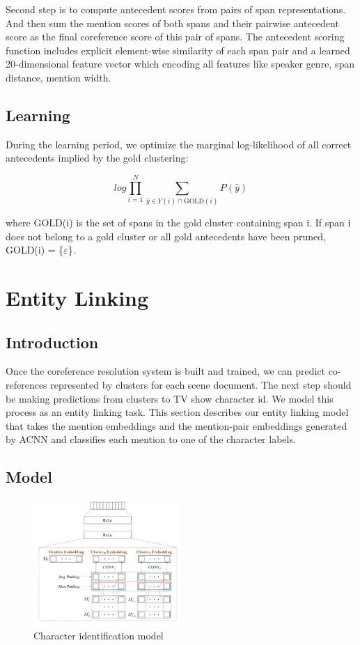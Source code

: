 \documentclass[11pt]{article}
\begin{document}
Second step is to compute antecedent scores from pairs of span representations. And then sum the mention scores of both spans and their pairwise antecedent score as the final coreference score of this pair of spans.
The antecedent scoring function includes explicit element-wise similarity of each span pair and a learned 20-dimensional feature vector which encoding all features like speaker genre, span distance, mention width.

\subsection{Learning}
During the learning period, we optimize the marginal log-likelihood of all correct antecedents implied by the gold clustering:

\begin{equation}
log\prod^{N}_{i=1}\sum_{\widehat{y}\in Y(i)\cap \text{GOLD}(i)}P(\widehat{y})
\end{equation}


where GOLD(i) is the set of spans in the gold cluster containing span i. If span i does not belong to a gold cluster or all gold antecedents have been pruned, GOLD(i) = \{$\varepsilon $\}.


\section{Entity Linking}

\subsection{Introduction}
Once the coreference resolution system is built and trained, we can predict co-references represented by clusters for each scene document. The next step should be making predictions from clusters to TV show character id. We model this process as an entity linking task. This section describes our entity linking model that takes the mention embeddings and the mention-pair embeddings generated by ACNN and classifies each mention to one of the character labels.

\subsection{Model}
\begin{figure}[h]                
 \includegraphics[width=0.5\textwidth]{05.jpg}
 \caption{Character identification model}             
\end{figure}
\end{document}
